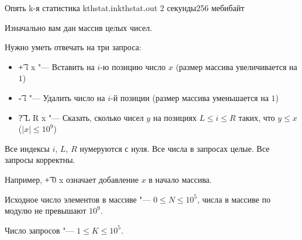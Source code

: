 %
%
%

\begin{problem}{Опять k-я статистика}
{kthstat.in}{kthstat.out}
{2 секунды}{256 мебибайт}{}

Изначально вам дан массив целых чисел.

Нужно уметь отвечать на три запроса:

\begin{itemize}
  \item{\t{+ i x} "--- Вставить на $i$-ю позицию число $x$
        (размер массива увеличивается на $1$)}
  \item{\t{- i} "--- Удалить число на $i$-й позиции
        (размер массива уменьшается на $1$)}
  \item{\t{? L R x} "--- Сказать, сколько чисел $y$
        на позициях $L \le i \le R$ таких, что $y \le x$ ($|x| \le 10^9$)}
\end{itemize}

Все индексы $i$, $L$, $R$ нумеруются с нуля.
Все числа в запросах целые.
Все запросы корректны.

Например, \t{+ 0 x} означает добавление $x$ в начало массива.

Исходное число элементов в массиве "--- $0 \le N \le 10^5$,
числа в массиве по модулю не превышают $10^9$.

Число запросов "--- $1 \le K \le 10^5$.

\Example

\begin{example}
%
\end{example}

\end{problem}

